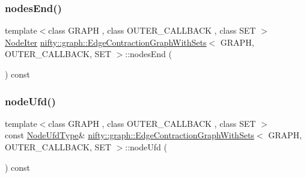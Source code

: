 \mbox{\label{classnifty_1_1graph_1_1EdgeContractionGraphWithSets_ae6b55d6c45a760b7e85e98fcbe89b5fa}} 
\subsubsection{\texorpdfstring{nodes\+End()}{nodesEnd()}}
{\footnotesize\ttfamily template$<$class G\+R\+A\+PH , class O\+U\+T\+E\+R\+\_\+\+C\+A\+L\+L\+B\+A\+CK , class S\+ET $>$ \\
\hyperlink{classnifty_1_1graph_1_1EdgeContractionGraphWithSets_af9e889455b883d034bf708a0b5b05bee}{Node\+Iter} \hyperlink{classnifty_1_1graph_1_1EdgeContractionGraphWithSets}{nifty\+::graph\+::\+Edge\+Contraction\+Graph\+With\+Sets}$<$ G\+R\+A\+PH, O\+U\+T\+E\+R\+\_\+\+C\+A\+L\+L\+B\+A\+CK, S\+ET $>$\+::nodes\+End (\begin{DoxyParamCaption}{ }\end{DoxyParamCaption}) const\hspace{0.3cm}{\ttfamily [inline]}}

\mbox{\label{classnifty_1_1graph_1_1EdgeContractionGraphWithSets_a00c248e34c7d08d44a9ef5a630c28ebc}} 
\subsubsection{\texorpdfstring{node\+Ufd()}{nodeUfd()}}
{\footnotesize\ttfamily template$<$class G\+R\+A\+PH , class O\+U\+T\+E\+R\+\_\+\+C\+A\+L\+L\+B\+A\+CK , class S\+ET $>$ \\
const \hyperlink{classnifty_1_1graph_1_1EdgeContractionGraphWithSets_ae340ffb867bc1eb19b139e879174607e}{Node\+Ufd\+Type}\& \hyperlink{classnifty_1_1graph_1_1EdgeContractionGraphWithSets}{nifty\+::graph\+::\+Edge\+Contraction\+Graph\+With\+Sets}$<$ G\+R\+A\+PH, O\+U\+T\+E\+R\+\_\+\+C\+A\+L\+L\+B\+A\+CK, S\+ET $>$\+::node\+Ufd (\begin{DoxyParamCaption}{ }\end{DoxyParamCaption}) const\hspace{0.3cm}{\ttfamily [inline]}}

